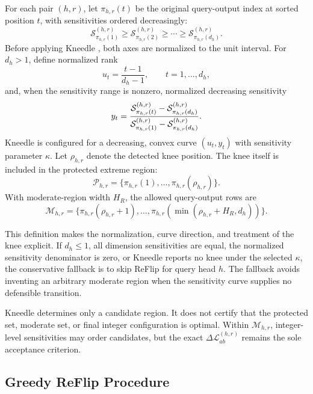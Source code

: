 For each pair $(h,r)$, let $\pi_{h,r}(t)$ be the original query-output index at sorted position $t$, with sensitivities ordered decreasingly:
\begin{equation}
\mathcal{S}^{(h,r)}_{\pi_{h,r}(1)}
\ge
\mathcal{S}^{(h,r)}_{\pi_{h,r}(2)}
\ge\cdots\ge
\mathcal{S}^{(h,r)}_{\pi_{h,r}(d_h)}.
\end{equation}
Before applying Kneedle \cite{satopaa2011kneedle}, both axes are normalized to the unit interval. For $d_h>1$, define normalized rank
\begin{equation}
u_t=\frac{t-1}{d_h-1},
\qquad t=1,\ldots,d_h,
\end{equation}
and, when the sensitivity range is nonzero, normalized decreasing sensitivity
\begin{equation}
y_t
=
\frac{%
\mathcal{S}^{(h,r)}_{\pi_{h,r}(t)}
-
\mathcal{S}^{(h,r)}_{\pi_{h,r}(d_h)}
}{%
\mathcal{S}^{(h,r)}_{\pi_{h,r}(1)}
-
\mathcal{S}^{(h,r)}_{\pi_{h,r}(d_h)}
}.
\end{equation}
Kneedle is configured for a decreasing, convex curve $(u_t,y_t)$ with sensitivity parameter $\kappa$. Let $\rho_{h,r}$ denote the detected knee position. The knee itself is included in the protected extreme region:
\begin{equation}
\mathcal{P}_{h,r}
=
\{
\pi_{h,r}(1),\ldots,\pi_{h,r}(\rho_{h,r})
\}.
\end{equation}
With moderate-region width $H_R$, the allowed query-output rows are
\begin{equation}
\mathcal{M}_{h,r}
=
\{
\pi_{h,r}(\rho_{h,r}+1),\ldots,
\pi_{h,r}(\min(\rho_{h,r}+H_R,d_h))
\}.
\end{equation}

This definition makes the normalization, curve direction, and treatment of the knee explicit. If $d_h\leq1$, all dimension sensitivities are equal, the normalized sensitivity denominator is zero, or Kneedle reports no knee under the selected $\kappa$, the conservative fallback is to skip ReFlip for query head $h$. The fallback avoids inventing an arbitrary moderate region when the sensitivity curve supplies no defensible transition.

Kneedle determines only a candidate region. It does not certify that the protected set, moderate set, or final integer configuration is optimal. Within $\mathcal{M}_{h,r}$, integer-level sensitivities may order candidates, but the exact $\Delta\mathcal{L}^{(h,r)}_{ab}$ remains the sole acceptance criterion.

\subsection{Greedy ReFlip Procedure}

